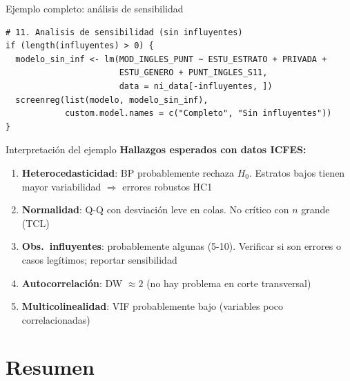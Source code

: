 \documentclass[aspectratio=169, 11pt]{beamer}
\begin{document}
\begin{frame}[fragile]{Ejemplo completo: análisis de sensibilidad}
\small
\begin{lstlisting}
# 11. Analisis de sensibilidad (sin influyentes)
if (length(influyentes) > 0) {
  modelo_sin_inf <- lm(MOD_INGLES_PUNT ~ ESTU_ESTRATO + PRIVADA +
                       ESTU_GENERO + PUNT_INGLES_S11,
                       data = ni_data[-influyentes, ])
  screenreg(list(modelo, modelo_sin_inf),
            custom.model.names = c("Completo", "Sin influyentes"))
}
\end{lstlisting}
\end{frame}

\begin{frame}{Interpretación del ejemplo}
\textbf{Hallazgos esperados con datos ICFES:}
\begin{enumerate}
\item \textbf{Heterocedasticidad}: BP probablemente rechaza $H_0$. Estratos bajos tienen mayor variabilidad $\Rightarrow$ errores robustos HC1
\item \textbf{Normalidad}: Q-Q con desviación leve en colas. No crítico con $n$ grande (TCL)
\item \textbf{Obs.\ influyentes}: probablemente algunas (5-10). Verificar si son errores o casos legítimos; reportar sensibilidad
\item \textbf{Autocorrelación}: DW $\approx 2$ (no hay problema en corte transversal)
\item \textbf{Multicolinealidad}: VIF probablemente bajo (variables poco correlacionadas)
\end{enumerate}
\end{frame}

\section{Resumen}
\end{document}
